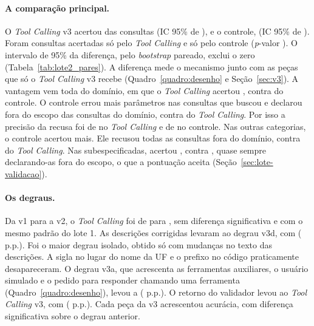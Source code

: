\begin{landscape}

\end{landscape}

\paragraph{A comparação principal.} O \textit{Tool Calling} v3 acertou  das consultas (IC 95\% de ), e o controle,  (IC 95\% de ). Foram  consultas acertadas só pelo \textit{Tool Calling} e  só pelo controle (\textit{p}-valor ). O intervalo de 95\% da diferença, pelo \textit{bootstrap} pareado, exclui o zero (Tabela~\ref{tab:lote2_pares}). A diferença mede o mecanismo junto com as peças que só o \textit{Tool Calling} v3 recebe (Quadro~\ref{quadro:desenho} e Seção~\ref{sec:v3}). A vantagem vem toda do domínio, em que o \textit{Tool Calling} acertou , contra  do controle. O controle errou mais parâmetros nas consultas que buscou e declarou fora do escopo  das consultas do domínio, contra  do \textit{Tool Calling}. Por isso a precisão da recusa foi de  no \textit{Tool Calling} e de  no controle. Nas outras categorias, o controle acertou mais. Ele recusou todas as consultas fora do domínio, contra  do \textit{Tool Calling}. Nas subespecificadas, acertou , contra , quase sempre declarando-as fora do escopo, o que a pontuação aceita (Seção~\ref{sec:lote-validacao}).

\paragraph{Os degraus.} Da v1 para a v2, o \textit{Tool Calling} foi de  para , sem diferença significativa e com o mesmo padrão do lote 1. As descrições corrigidas levaram ao degrau v3d, com  ( p.p.). Foi o maior degrau isolado, obtido só com mudanças no texto das descrições. A sigla no lugar do nome da UF e o prefixo no código praticamente desapareceram. O degrau v3a, que acrescenta as ferramentas auxiliares, o usuário simulado e o pedido para responder chamando uma ferramenta (Quadro~\ref{quadro:desenho}), levou a  ( p.p.). O retorno do validador levou ao \textit{Tool Calling} v3, com  ( p.p.). Cada peça da v3 acrescentou acurácia, com diferença significativa sobre o degrau anterior.


